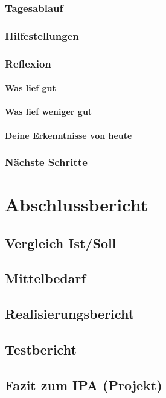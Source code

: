 \documentclass{report}
\begin{document}
\subsection{Tagesablauf}
\lipsum[1-3]
\subsection{Hilfestellungen}
\subsection{Reflexion}
\subsubsection*{Was lief gut}

\subsubsection*{Was lief weniger gut}

\subsubsection*{Deine Erkenntnisse von heute}


\subsection{Nächste Schritte}

\chapter{Abschlussbericht}
\section{Vergleich Ist/Soll}
\section{Mittelbedarf}
\section{Realisierungsbericht}
\section{Testbericht}
\section{Fazit zum IPA (Projekt)}
\end{document}
